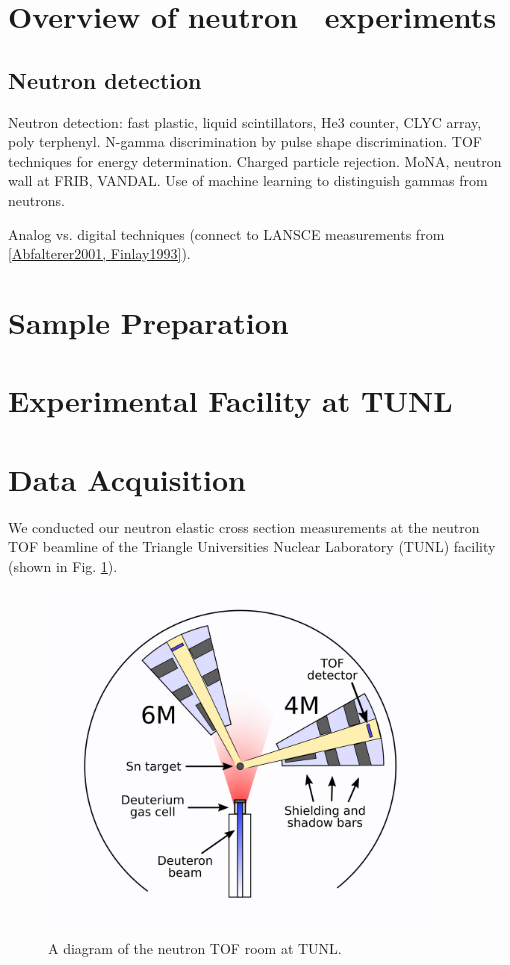 \section{Overview of neutron \el\ experiments}
\subsection{Neutron detection}
Neutron detection: fast plastic, liquid scintillators, He3 counter, CLYC array, poly
terphenyl. N-gamma discrimination by pulse shape discrimination. TOF techniques
for energy determination. Charged particle rejection. MoNA, neutron wall at
FRIB, VANDAL. Use of machine learning to distinguish gammas from neutrons.

Analog vs. digital techniques (connect to LANSCE measurements from \ref{Abfalterer2001, Finlay1993}).

\section{Sample Preparation}
\section{Experimental Facility at TUNL}
\section{Data Acquisition}

We conducted our neutron elastic cross section measurements at the neutron TOF
beamline of the Triangle Universities Nuclear Laboratory (TUNL) facility
(shown in Fig. \ref{ExperimentalSetupTUNL}).

\begin{figure}
  \begin{center}
\includegraphics[width = 0.9\textwidth]{figures/ExperimentalSetupTUNL.png}
\caption{A diagram of the neutron TOF room at TUNL.} 
\label{ExperimentalSetupTUNL}
\end{center}
\end{figure}

